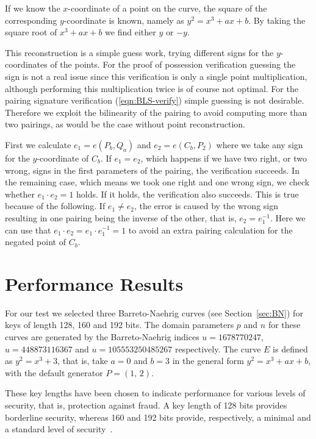 If we know the $x$-coordinate of a point on the curve, the square of the
corresponding $y$-coordinate is known, namely as $y^{2} = x^{3} + ax + b$.
By taking the square root of $x^{3} + ax + b$ we find either $y$ or $-y$.

This reconstruction is a simple guess work, trying different signs for the
$y$-coordinates of the points. For the proof of possession verification guessing
the sign is not a real issue since this verification is only a single point 
multiplication, although performing this 
multiplication twice is of course not optimal. For the pairing signature 
verification (\ref{eqn:BLS-verify}) simple guessing is not desirable. Therefore
we exploit the bilinearity of the pairing to avoid computing more than two pairings, as would be the case 
without point reconstruction.

First we calculate $e_1 = e(P_b, Q_a)$ and $e_2 = e(C_b, P_2)$ where we take
any sign for the $y$-coordinate of $C_b$. If $e_1 = e_2$, which happens if we
have two right, or two wrong, signs in the first parameters of the pairing, the
verification succeeds. In the remaining case, which means we took one right and
one wrong sign, we check whether $e_1 \cdot e_2 = 1$ holds. If it holds, the
verification also succeeds. This is true because of the following. If
$e_1 \neq e_2$, the error is caused by the wrong sign resulting in one pairing
being the inverse of the other, that is, $e_2 = e_1^{-1}$. Here we can use that
$e_1 \cdot e_2 = e_1 \cdot e_1^{-1} = 1$ to avoid an extra pairing calculation
for the negated point of $C_b$.

\section{Performance Results}\label{sec:sbc-performance}

For our test we selected three Barreto-Naehrig curves 
(see Section~\ref{sec:BN}) for keys of length 128,
160 and 192 bits. The domain parameters $p$ and $n$ for these curves are
generated by the Barreto-Naehrig indices $u=1678770247$, $u=448873116367$ and
$u=105553250485267$ respectively. The curve $E$ is
defined as $y^2 = x^3 + 3$, that is, take $a = 0$ and $b = 3$ in the general
form $y^2 = x^3 + ax + b$, with the default generator $P = (1,\, 2)$.

These key lengths have been chosen to indicate performance for various levels of
security, that is, protection against fraud. A key length of 128 bits provides
borderline security, whereas 160 and 192 bits provide, respectively, a minimal
and a standard level of security~\cite{Ecrypt}.

